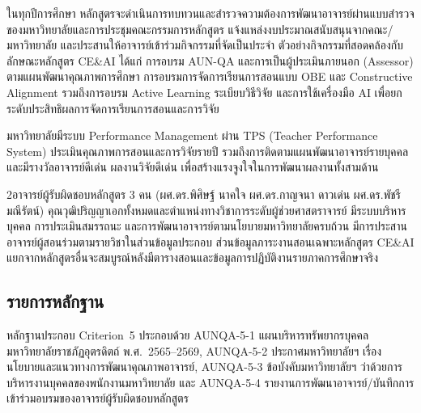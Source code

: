 ในทุกปีการศึกษา หลักสูตรจะดำเนินการทบทวนและสำรวจความต้องการพัฒนาอาจารย์ผ่านแบบสำรวจของมหาวิทยาลัยและการประชุมคณะกรรมการหลักสูตร แจ้งแหล่งงบประมาณสนับสนุนจากคณะ/มหาวิทยาลัย และประสานให้อาจารย์เข้าร่วมกิจกรรมที่จัดเป็นประจำ ตัวอย่างกิจกรรมที่สอดคล้องกับลักษณะหลักสูตร CE\&AI ได้แก่
การอบรม AUN-QA และการเป็นผู้ประเมินภายนอก (Assessor) ตามแผนพัฒนาคุณภาพการศึกษา การอบรมการจัดการเรียนการสอนแบบ OBE และ Constructive Alignment รวมถึงการอบรม Active Learning ระเบียบวิธีวิจัย และการใช้เครื่องมือ AI เพื่อยกระดับประสิทธิผลการจัดการเรียนการสอนและการวิจัย


มหาวิทยาลัยมีระบบ Performance Management ผ่าน TPS (Teacher Performance System) ประเมินคุณภาพการสอนและการวิจัยรายปี รวมถึงการติดตามแผนพัฒนาอาจารย์รายบุคคล และมีรางวัลอาจารย์ดีเด่น ผลงานวิจัยดีเด่น เพื่อสร้างแรงจูงใจในการพัฒนาผลงานทั้งสามด้าน

\begin{selfassessmentbox}{2}{อาจารย์ผู้รับผิดชอบหลักสูตร 3 คน (ผศ.ดร.พิศิษฐ์ นาคใจ ผศ.ดร.กาญจนา ดาวเด่น ผศ.ดร.พัชรี มณีรัตน์) คุณวุฒิปริญญาเอกทั้งหมดและตำแหน่งทางวิชาการระดับผู้ช่วยศาสตราจารย์ มีระบบบริหารบุคคล การประเมินสมรรถนะ และการพัฒนาอาจารย์ตามนโยบายมหาวิทยาลัยครบถ้วน มีการประสานอาจารย์ผู้สอนร่วมตามรายวิชาในส่วนข้อมูลประกอบ ส่วนข้อมูลภาระงานสอนเฉพาะหลักสูตร CE\&AI แยกจากหลักสูตรอื่นจะสมบูรณ์หลังมีตารางสอนและข้อมูลการปฏิบัติงานรายภาคการศึกษาจริง}
\end{selfassessmentbox}

\subsection*{รายการหลักฐาน}

หลักฐานประกอบ Criterion~5 ประกอบด้วย AUNQA-5-1 แผนบริหารทรัพยากรบุคคล มหาวิทยาลัยราชภัฏอุตรดิตถ์ พ.ศ.~2565--2569, AUNQA-5-2 ประกาศมหาวิทยาลัยฯ เรื่อง นโยบายและแนวทางการพัฒนาคุณภาพอาจารย์, AUNQA-5-3 ข้อบังคับมหาวิทยาลัยฯ ว่าด้วยการบริหารงานบุคคลของพนักงานมหาวิทยาลัย และ AUNQA-5-4 รายงานการพัฒนาอาจารย์/บันทึกการเข้าร่วมอบรมของอาจารย์ผู้รับผิดชอบหลักสูตร
